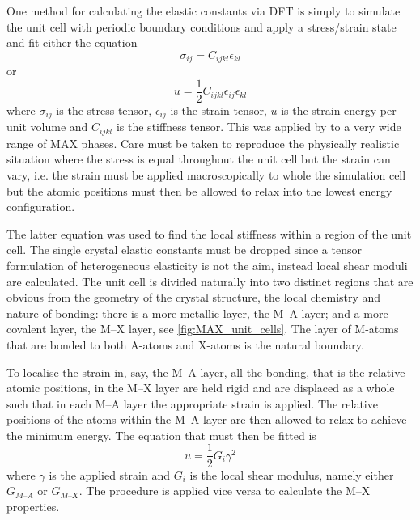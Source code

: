 One method for calculating the elastic constants via DFT is simply to simulate the unit cell with periodic boundary conditions and apply a stress/strain state and fit either the equation
\begin{equation}
\sigma_{ij} = C_{ijkl} \epsilon_{kl}
\end{equation}
or 
\begin{equation}
u = \frac{1}{2} C_{ijkl} \epsilon_{ij} \epsilon_{kl}
\end{equation}
where $\sigma_{ij}$ is the stress tensor, $\epsilon_{ij}$ is the strain tensor, $u$ is the strain energy per unit volume and $C_{ijkl}$ is the stiffness tensor. This was applied by \citet{Aryal2014} to a very wide range of MAX phases. Care must be taken to reproduce the physically realistic situation where the stress is equal throughout the unit cell but the strain can vary, i.e. the strain must be applied macroscopically to whole the simulation cell but the atomic positions must then be allowed to relax into the lowest energy configuration.

The latter equation was used to find the local stiffness within a region of the unit cell. The single crystal elastic constants must be dropped since a tensor formulation of heterogeneous elasticity is not the aim, instead local shear moduli are calculated. The unit cell is divided naturally into two distinct regions that are obvious from the geometry of the crystal structure, the local chemistry and nature of bonding: there is a more metallic layer, the M--A layer; and a more covalent layer, the M--X layer, see \autoref{fig:MAX_unit_cells}. The layer of M-atoms that are bonded to both A-atoms and X-atoms is the natural boundary.

To localise the strain in, say, the M--A layer, all the bonding, that is the relative atomic positions, in the M--X layer are held rigid and are displaced as a whole such that in each M--A layer the appropriate strain is applied. The relative positions of the atoms within the M--A layer are then allowed to relax to achieve the minimum energy. The equation that must then be fitted is
\begin{equation}
u = \frac{1}{2} G_{i} \gamma^2
\end{equation}
where $\gamma$ is the applied strain and $G_i$ is the local shear modulus, namely either $G_{M\text{--}A}$ or $G_{M\text{--}X}$. The procedure is applied vice versa to calculate the M--X properties.




